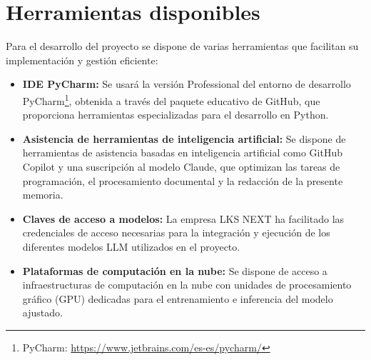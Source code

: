 \section{Herramientas disponibles}
Para el desarrollo del proyecto se dispone de varias herramientas que facilitan su implementación y gestión eficiente:
\begin{itemize}
\item\textbf{IDE PyCharm: }Se usará la versión Professional del entorno de desarrollo PyCharm\footnote{PyCharm: \url{https://www.jetbrains.com/es-es/pycharm/}}, obtenida a través del paquete educativo de GitHub, que proporciona herramientas especializadas para el desarrollo en Python.
\item\textbf{Asistencia de herramientas de inteligencia artificial: }Se dispone de herramientas de asistencia basadas en inteligencia artificial como GitHub Copilot y una suscripción al modelo Claude, que optimizan las tareas de programación, el procesamiento documental y la redacción de la presente memoria.
\item\textbf{Claves de acceso a modelos: }La empresa LKS NEXT ha facilitado las credenciales de acceso necesarias para la integración y ejecución de los diferentes modelos LLM utilizados en el proyecto.
\item\textbf{Plataformas de computación en la nube: }Se dispone de acceso a infraestructuras de computación en la nube con unidades de procesamiento gráfico (GPU) dedicadas para el entrenamiento e inferencia del modelo ajustado.
\end{itemize}












